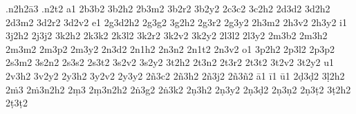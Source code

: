 .n2h2ā3
.n2t2
a1
2b3b2
3b2h2
2b3m2
3b2r2
3b2y2
2c3c2
3c2h2
2d3d2
3d2h2
2d3m2
3d2r2
3d2v2
e1
2g3d2h2
2g3g2
3g2h2
2g3r2
2g3y2
2h3m2
2h3v2
2h3y2
i1
3j2h2
2j3j2
3k2h2
2k3k2
2k3l2
3k2r2
3k2v2
3k2y2
2l3l2
2l3y2
2m3b2
2m3h2
2m3m2
2m3p2
2m3y2
2n3d2
2n1h2
2n3n2
2n1t2
2n3v2
o1
3p2h2
2p3l2
2p3p2
2s3m2
3s2n2
2s3s2
2s3t2
3s2v2
3s2y2
3t2h2
2t3n2
2t3r2
2t3t2
3t2v2
3t2y2
u1
2v3h2
3v2y2
2y3h2
3y2v2
2y3y2
2ñ3c2
2ñ3h2
2ñ3j2
2ñ3ñ2
ā1
ī1
ū1
2ḍ3ḍ2
3ḷ2h2
2ṁ3
2ṁ3n2h2
2ṃ3
2ṃ3n2h2
2ṅ3g2
2ṅ3k2
2ṇ3h2
2ṇ3y2
2ṇ3ḍ2
2ṇ3ṇ2
2ṇ3ṭ2
3ṭ2h2
2ṭ3ṭ2
